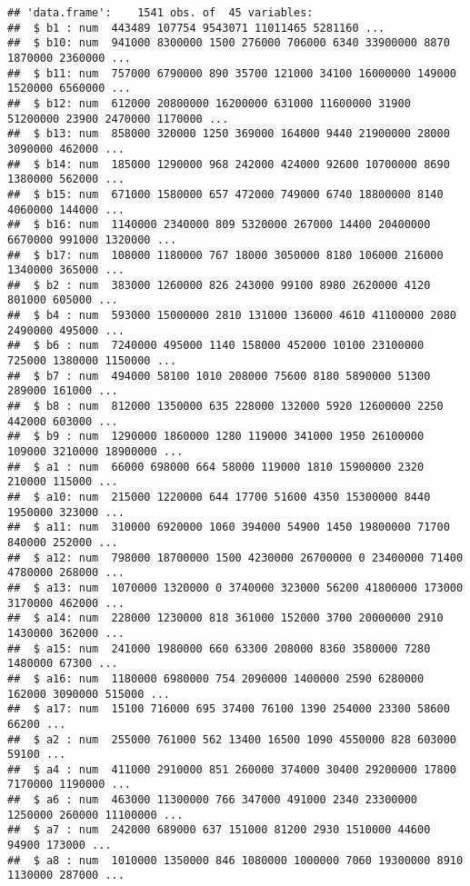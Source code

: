 \documentclass[
]{article}
\begin{document}
\begin{verbatim}
## 'data.frame':    1541 obs. of  45 variables:
##  $ b1 : num  443489 107754 9543071 11011465 5281160 ...
##  $ b10: num  941000 8300000 1500 276000 706000 6340 33900000 8870 1870000 2360000 ...
##  $ b11: num  757000 6790000 890 35700 121000 34100 16000000 149000 1520000 6560000 ...
##  $ b12: num  612000 20800000 16200000 631000 11600000 31900 51200000 23900 2470000 1170000 ...
##  $ b13: num  858000 320000 1250 369000 164000 9440 21900000 28000 3090000 462000 ...
##  $ b14: num  185000 1290000 968 242000 424000 92600 10700000 8690 1380000 562000 ...
##  $ b15: num  671000 1580000 657 472000 749000 6740 18800000 8140 4060000 144000 ...
##  $ b16: num  1140000 2340000 809 5320000 267000 14400 20400000 6670000 991000 1320000 ...
##  $ b17: num  108000 1180000 767 18000 3050000 8180 106000 216000 1340000 365000 ...
##  $ b2 : num  383000 1260000 826 243000 99100 8980 2620000 4120 801000 605000 ...
##  $ b4 : num  593000 15000000 2810 131000 136000 4610 41100000 2080 2490000 495000 ...
##  $ b6 : num  7240000 495000 1140 158000 452000 10100 23100000 725000 1380000 1150000 ...
##  $ b7 : num  494000 58100 1010 208000 75600 8180 5890000 51300 289000 161000 ...
##  $ b8 : num  812000 1350000 635 228000 132000 5920 12600000 2250 442000 603000 ...
##  $ b9 : num  1290000 1860000 1280 119000 341000 1950 26100000 109000 3210000 18900000 ...
##  $ a1 : num  66000 698000 664 58000 119000 1810 15900000 2320 210000 115000 ...
##  $ a10: num  215000 1220000 644 17700 51600 4350 15300000 8440 1950000 323000 ...
##  $ a11: num  310000 6920000 1060 394000 54900 1450 19800000 71700 840000 252000 ...
##  $ a12: num  798000 18700000 1500 4230000 26700000 0 23400000 71400 4780000 268000 ...
##  $ a13: num  1070000 1320000 0 3740000 323000 56200 41800000 173000 3170000 462000 ...
##  $ a14: num  228000 1230000 818 361000 152000 3700 20000000 2910 1430000 362000 ...
##  $ a15: num  241000 1980000 660 63300 208000 8360 3580000 7280 1480000 67300 ...
##  $ a16: num  1180000 6980000 754 2090000 1400000 2590 6280000 162000 3090000 515000 ...
##  $ a17: num  15100 716000 695 37400 76100 1390 254000 23300 58600 66200 ...
##  $ a2 : num  255000 761000 562 13400 16500 1090 4550000 828 603000 59100 ...
##  $ a4 : num  411000 2910000 851 260000 374000 30400 29200000 17800 7170000 1190000 ...
##  $ a6 : num  463000 11300000 766 347000 491000 2340 23300000 1250000 260000 11100000 ...
##  $ a7 : num  242000 689000 637 151000 81200 2930 1510000 44600 94900 173000 ...
##  $ a8 : num  1010000 1350000 846 1080000 1000000 7060 19300000 8910 1130000 287000 ...

\end{verbatim}
\end{document}

